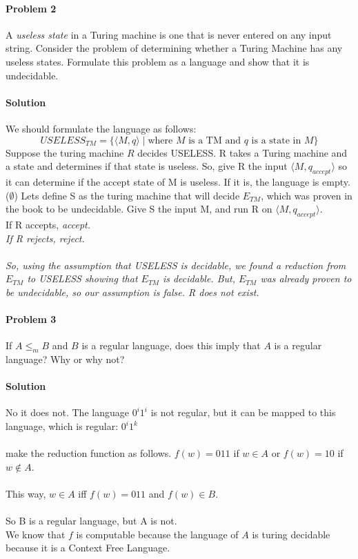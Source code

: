 \documentclass{article}
\begin{document}
\paragraph{Problem 2} A {\em useless state} in a Turing machine
is one that is never entered on any input string.  Consider the 
problem of determining whether a Turing Machine has any useless 
states.  Formulate this problem as a language and show that it 
is undecidable.

\paragraph{Solution} We should formulate the language as follows:
\[USELESS_{TM} = \{ \langle M,q \rangle \;|\; \mbox{where $M$ is a TM and $q$ is a state in $M$} \}\]
\noindent Suppose the turing machine $R$ decides USELESS. R takes a Turing machine and a state and determines if that state is useless. So, give R the input $\langle M, q_{accept}\rangle$ so it can determine if the accept state of M is useless. If it is, the language is empty. ($\emptyset$) Lets define S as the turing machine that will decide $E_{TM}$, which was proven in the book to be undecidable. Give S the input M, and run R on $\langle M, q_{accept}\rangle$.
\\If R accepts, \em accept.\em
\\If R rejects, \em reject. \em
\\\\So, using the assumption that USELESS is decidable, we found a reduction from $E_{TM}$ to USELESS showing that $E_{TM}$ is decidable. But, $E_{TM}$ was already proven to be undecidable, so our assumption is false. R does not exist.

\paragraph{Problem 3} If $A \leq_m B$ and $B$ is a regular language,
does this imply that $A$ is a regular language? Why or why not?
\paragraph{Solution} No it does not. The language $0^i1^i$ is not regular, but it can be mapped to this language, which is regular: $0^i1^k$
\\\\make the reduction function as follows. $f(w) = 011$ if $w \in A$ or $f(w) = 10$ if $w \notin A$.
\\\\This way, $w \in A$ iff $f(w) = 011$ and $f(w) \in B$.
\\\\So B is a regular language, but A is not.
\\We know that $f$ is computable because the language of $A$ is turing decidable because it is a Context Free Language.
\end{document}
